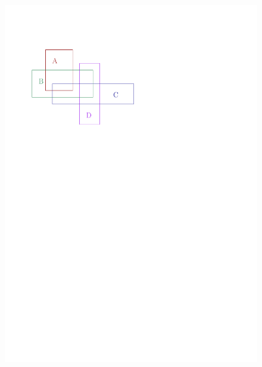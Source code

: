 \documentclass[english,gradu]{tktltiki2018}
\begin{document}
\begin{figure}\centering
	\includegraphics[scale=0.7,page=1]{fig/inter}
	\hfil

\end{figure}
\end{document}
